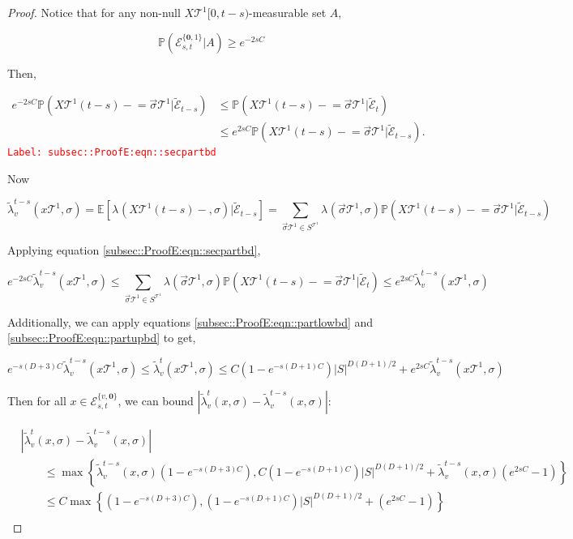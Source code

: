 \documentclass[12pt]{article}
\newcommand{\mb}{\mathbb}
\newcommand{\mc}{\mathcal}
\newcommand{\tr}{\textcolor{red}}
\newcommand{\labe}[1]{\tr{\texttt{Label: #1}}}
\newcommand{\pr}{\mb{P}}							%
\newcommand{\ex}[1]{\mb{E}\left[#1\right]}			%
\renewcommand{\root}{\mathbf{0}}				%
\renewcommand{\v}{v}							%
\renewcommand{\S}{S}							%
\newcommand{\s}{\sigma}							%
\newcommand{\sv}{\vec{\s}}						%
\newcommand{\x}{x}								%
\renewcommand{\t}{t}							%
\renewcommand{\tt}{s}							%
\newcommand{\X}{X}								%
\newcommand{\const}{C}							%
\newcommand{\degr}{D}							%
\newcommand{\tree}{\mc{T}}						%
\newcommand{\sln}[1]{^{#1}}						%
\newcommand{\XState}[1]{\S^{#1}}				%
\newcommand{\rate}[1]{\lambda_{#1}}					%
\newcommand{\crate}[2]{\alt{\lambda}_{#1}^{#2}}		%
\newcommand{\alt}{\widetilde}						%
\newcommand{\evnt}{\mc{E}}						%
\newcommand{\typset}{A}							%
\begin{document}
\begin{proof}
Notice that for any non-null \(\X{\tree\sln{1}}{[0,\t-\tt)}\)-measurable set \(\typset\), 

\[\pr(\evnt^{\{\root,1\}}_{\tt,\t}|\typset) \geq e^{-2\tt\const{}}\]

Then,

\begin{align}
e^{-2\tt\const{}}\pr\left(\X{\tree\sln{1}}{(\t-\tt)-}=\sv{}{\tree\sln{1}}|\alt{\evnt}_{\t-\tt}\right) &\leq \pr\left(\X{\tree\sln{1}}{(\t-\tt)-}=\sv{}{\tree\sln{1}}|\alt{\evnt}_{\t}\right)\nonumber\\
&\leq e^{2\tt\const{}}\pr\left(\X{\tree\sln{1}}{(\t-\tt)-}=\sv{}{\tree\sln{1}}|\alt{\evnt}_{\t-\tt}\right).
\label{subsec::ProofE:eqn::secpartbd}
\end{align}
\labe{subsec::ProofE:eqn::secpartbd}

Now

\[\crate{\v}{\t-\tt}(\x{\tree\sln{1}}{},\s) = \ex{\rate{}(\X{\tree\sln{1}}{(\t-\tt)-},\s)|\alt{\evnt}_{\t-\tt}} = \sum_{\sv{}{\tree\sln{1}}\in \S^{\tree\sln{1}}}\rate{}(\sv{}{\tree\sln{1}},\s)\pr\left(\X{\tree\sln{1}}{(\t-\tt)-} = \sv{}{\tree\sln{1}}|\alt{\evnt}_{\t-\tt}\right)\]

Applying equation \eqref{subsec::ProofE:eqn::secpartbd},

\[e^{-2\tt\const{}}\crate{\v}{\t-\tt}(\x{\tree\sln{1}}{},\s) \leq \sum_{\sv{}{\tree\sln{1}}\in \S^{\tree\sln{1}}} \lambda(\sv{}{\tree\sln{1}},\s)\pr(\X{\tree\sln{1}}{(\t-\tt)-} = \sv{}{\tree\sln{1}}|\alt{\evnt}_\t)\leq e^{2\tt\const{}}\crate{\v}{\t-\tt}(\x{\tree\sln{1}}{},\s)\]

Additionally, we can apply equations \eqref{subsec::ProofE:eqn::partlowbd} and  \eqref{subsec::ProofE:eqn::partupbd} to get,

\[e^{-\tt(\degr+3)\const{}}\crate{\v}{\t-\tt}(\x{\tree\sln{1}}{},\s) \leq \crate{\v}{\t}(\x{\tree\sln{1}}{},\s) \leq \const{}(1 - e^{-\tt(\degr+1)\const{}})|S|^{\degr(\degr+1)/2} + e^{2\tt\const{}}\crate{\v}{\t-\tt}(\x{\tree\sln{1}}{},\s)\]

Then for all \(\x{}{} \in \evnt^{\{\v,\root\}}_{\tt,\t}\), we can bound \(|\crate{\v}{\t}(\x{}{},\s) - \crate{\v}{\t-\tt}(\x{}{},\s)|\):

\begin{align*}
&|\crate{\v}{\t}(\x{}{},\s) - \crate{\v}{\t-\tt}(\x{}{},\s)| \\
&\hspace{24pt}\leq \max\left\{\crate{\v}{\t-\tt}(\x{}{},\s)\left(1 - e^{-\tt(\degr+3)\const{}}\right),\const{}(1-e^{-\tt(\degr+1)\const{}})|\S|^{\degr(\degr+1)/2} + \crate{\v}{\t-\tt}(\x{}{},\s)\left(e^{2\tt\const{}} - 1\right)\right\}\\
&\hspace{24pt}\leq \const{}\max\left\{\left(1 - e^{-\tt(\degr+3)\const{}}\right),(1-e^{-\tt(\degr+1)\const{}})|\S|^{\degr(\degr+1)/2} + \left(e^{2\tt\const{}} - 1\right)\right\}\\
\end{align*}


\end{proof}
\end{document}
